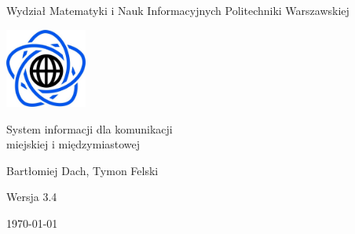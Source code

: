 \documentclass[10pt,a4paper]{article}
\begin{document}
\begin{titlepage}
	\centering
	{\Large Wydział Matematyki i Nauk Informacyjnych Politechniki Warszawskiej \par}
	\vspace{1cm}
	\includegraphics[width=0.2\textwidth]{Resources/Images/logo.png} \par
	\vspace{5cm}
	{\LARGE System informacji dla komunikacji \\ miejskiej i międzymiastowej \par}
	\vspace{0.5cm}
	{\Large Bartłomiej Dach, Tymon Felski \par}
	\vspace{1.5cm}
	{\Large Wersja 3.4 \par}
	\vspace{1.5cm}
	{\Large \today \par}
\end{titlepage}
\end{document}
